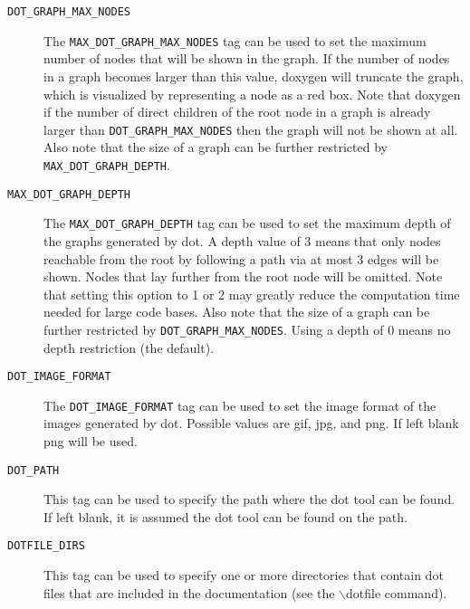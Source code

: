 \begin{description}
\label{config_cfg_dot_graph_max_nodes}
\hypertarget{config_cfg_dot_graph_max_nodes}{}
 \item[{\tt DOT\_\-GRAPH\_\-MAX\_\-NODES} ] The {\tt MAX\_\-DOT\_\-GRAPH\_\-MAX\_\-NODES} tag can be used to set the maximum number of nodes that will be shown in the graph. If the number of nodes in a graph becomes larger than this value, doxygen will truncate the graph, which is visualized by representing a node as a red box. Note that doxygen if the number of direct children of the root node in a graph is already larger than {\tt DOT\_\-GRAPH\_\-MAX\_\-NODES} then the graph will not be shown at all. Also note that the size of a graph can be further restricted by {\tt MAX\_\-DOT\_\-GRAPH\_\-DEPTH}.

\label{config_cfg_max_dot_graph_depth}
\hypertarget{config_cfg_max_dot_graph_depth}{}
 \item[{\tt MAX\_\-DOT\_\-GRAPH\_\-DEPTH} ] The {\tt MAX\_\-DOT\_\-GRAPH\_\-DEPTH} tag can be used to set the maximum depth of the graphs generated by dot. A depth value of 3 means that only nodes reachable from the root by following a path via at most 3 edges will be shown. Nodes that lay further from the root node will be omitted. Note that setting this option to 1 or 2 may greatly reduce the computation time needed for large code bases. Also note that the size of a graph can be further restricted by {\tt DOT\_\-GRAPH\_\-MAX\_\-NODES}. Using a depth of 0 means no depth restriction (the default).

\label{config_cfg_dot_image_format}
\hypertarget{config_cfg_dot_image_format}{}
 \item[{\tt DOT\_\-IMAGE\_\-FORMAT} ] The {\tt DOT\_\-IMAGE\_\-FORMAT} tag can be used to set the image format of the images generated by dot. Possible values are gif, jpg, and png. If left blank png will be used.

\label{config_cfg_dot_path}
\hypertarget{config_cfg_dot_path}{}
 \item[{\tt DOT\_\-PATH} ] This tag can be used to specify the path where the dot tool can be found. If left blank, it is assumed the dot tool can be found on the path.

\label{config_cfg_dotfile_dirs}
\hypertarget{config_cfg_dotfile_dirs}{}
 \item[{\tt DOTFILE\_\-DIRS} ] This tag can be used to specify one or more directories that contain dot files that are included in the documentation (see the $\backslash$dotfile command).


\end{description}
